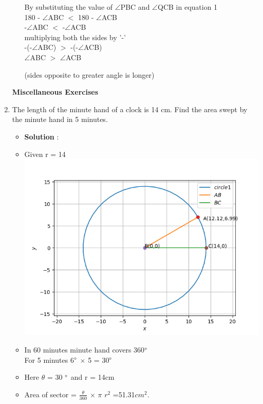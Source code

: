 \documentclass[journal,12pt,twocolumn]{IEEEtran}
\begin{document}
\begin{enumerate}[label=\arabic*]
\begin{itemize}
By substituting the value of $\angle$PBC and $\angle$QCB in equation 1 \\

180 - $\angle$ABC $<$ 180 - $\angle$ACB\\
-$\angle$ABC $<$ -$\angle$ACB\\

multiplying both the sides by '-'\\

-(-$\angle$ABC) $>$  -(-$\angle$ACB)\\
$\angle$ABC $>$ $\angle$ACB
  
 (sides opposite to greater angle is longer)\\
\end{itemize}






\textbf{Miscellaneous Exercises}\\

\item The length of the
minute hand of a clock is 14 cm. Find the area
swept by the minute hand in 5 minutes.\\
\begin{itemize}
\item \textbf{Solution} :
\item Given r = 14 \\


\includegraphics[scale=.6]{./CODES/quad/MISC.png}


 \item In 60 minutes minute hand covers  360$\degree$\\
For 5 minutes 6$\degree$ $\times$ 5 = 30$\degree$ 
\item Here $\theta$ = 30 $\degree$ and r = 14cm\\
\item Area of sector = $\frac{\theta}{360}$ $\times$ $\pi$ $r^2$
	=51.31$cm^2.$\\
	


\end{itemize}
\end{enumerate}
\end{document}
